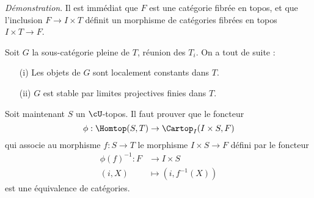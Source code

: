 {\it Démonstration}. Il est immédiat que $F$ est une catégorie fibrée en topos, et que l'inclusion $F \to I \times T$ définit un morphisme de catégories fibrées en topos $I \times T \to F$.

Soit $G$ la sous-catégorie pleine de $T$, réunion des $T_i$. On a tout de suite :
\begin{enumerate}
    \item[(i)] Les objets de $G$ sont localement constants dans $T$.
    \item[(ii)] $G$ est stable par limites projectives finies dans $T$.
\end{enumerate}

Soit maintenant $S$ un $\cU$-topos. Il faut prouver que le foncteur
$$
\phi: \Homtop(S, T) \to \Cartop_I(I \times S, F)
$$
qui associe au morphisme $f: S \to T$ le morphisme $I \times S \to F$ défini par le foncteur
\begin{align*}
\phi(f)^{-1}: F &\to I \times S\\
(i, X) &\mapsto (i, f^{-1}(X))
\end{align*}
est une équivalence de catégories.
